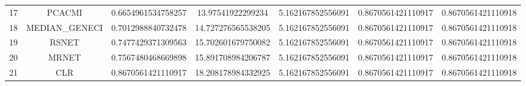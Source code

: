 \documentclass[a4paper,10pt]{article}
\begin{document}
\begin{landscape}
\begin{table}[!htp]
\begin{tabular}{ccccccc}
17&PCACMI&0.6654961534758257&13.97541922299234&5.162167852556091&0.8670561421110917&0.8670561421110918\\
18&MEDIAN_GENECI&0.7012988840732478&14.727276565538205&5.162167852556091&0.8670561421110917&0.8670561421110918\\
19&RSNET&0.7477429371309563&15.702601679750082&5.162167852556091&0.8670561421110917&0.8670561421110918\\
20&MRNET&0.7567480468669898&15.891708984206787&5.162167852556091&0.8670561421110917&0.8670561421110918\\
21&CLR&0.8670561421110917&18.208178984332925&5.162167852556091&0.8670561421110917&0.8670561421110918\\
\hline
\end{tabular}
\end{table}


\end{landscape}
\end{document}
